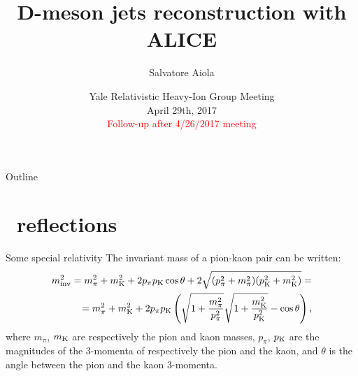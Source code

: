 \documentclass[xcolor={usenames,dvipsnames}]{beamer}
\title[D-meson jets reconstruction with ALICE] %
{D-meson jets reconstruction with ALICE}
\author[Salvatore Aiola]%
{Salvatore Aiola}
\institute[Yale University] %
{Yale University}
\date[Apr. 29th, 2017] %
{Yale Relativistic Heavy-Ion Group Meeting \\
April 29th, 2017 \\
\textcolor{red}{Follow-up after 4/26/2017 meeting}}
\begin{document}
\begin{frame}
  \titlepage
\end{frame}

\begin{frame}{Outline}
   \tableofcontents
\end{frame}








\section{\Dzero\ reflections}

\begin{frame}{Some special relativity}
The invariant mass of a pion-kaon pair can be written:
\begin{equation}
\begin{split}
m_{\rm inv}^{2} = m_{\pi}^{2} + m_{\rm K}^{2} + 2p_{\pi}p_{\rm K}\cos\theta + 2\sqrt{(p_{\pi}^{2}+m_{\pi}^{2})(p_{\rm K}^{2}+m_{\rm K}^{2})} =  \\
= m_{\pi}^{2} + m_{\rm K}^{2} + 2p_{\pi}p_{\rm K}\left(\sqrt{1+\frac{m_{\pi}^{2}}{p_{\pi}^{2}}}\sqrt{1+\frac{m_{\rm K}^{2}}{p_{\rm K}^{2}}} - \cos\theta\right),
\end{split}
\label{eq:minv}
\end{equation}
where $m_{\pi}$, $m_{\rm K}$ are respectively the pion and kaon masses, $p_{\pi}$, $p_{\rm K}$ are the magnitudes of the 3-momenta of respectively the pion and the kaon,
and $\theta$ is the angle between the pion and the kaon 3-momenta.
\end{frame}
\end{document}
